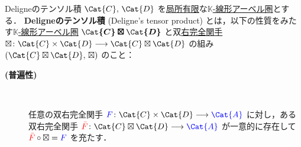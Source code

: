 \documentclass[TQFT_main]{subfiles}
\begin{document}
\begin{mydef}[label=def:DeligneProduct]{Deligneのテンソル積}
    $\Cat{C},\, \Cat{D}$ を\hyperref[def:finite-abcat]{局所有限}な\hyperref[def:additive-cat]{$\mathbb{K}$-線形アーベル圏}とする．
    \textbf{Deligneのテンソル積} (Deligne's tensor product) とは，以下の性質をみたす\hyperref[def:additive-cat]{$\mathbb{K}$-線形アーベル圏} $\bm{\Cat{C} \boxtimes \Cat{D}}$ と双\hyperref[def:additive-exact]{右完全関手} $\boxtimes \colon \Cat{C} \times \Cat{D} \lto \Cat{C} \boxtimes \Cat{D}$ の組み $(\Cat{C} \boxtimes \Cat{D},\, \boxtimes)$ のこと：
    \begin{description}
        \item[\textbf{(普遍性)}]　
        
        任意の双右完全関手 $\textcolor{blue}{F} \colon \Cat{C} \times \Cat{D} \lto \textcolor{blue}{\Cat{A}}$ に対し，ある双右完全関手 $\textcolor{red}{\bar{F}} \colon \Cat{C} \boxtimes \Cat{D} \lto \textcolor{blue}{\Cat{A}}$ が一意的に存在して $\textcolor{red}{\bar{F}} \circ \boxtimes = \textcolor{blue}{F}$ を充たす．
        \begin{center}
        \end{center}
    \end{description}
\end{mydef}
\end{document}
